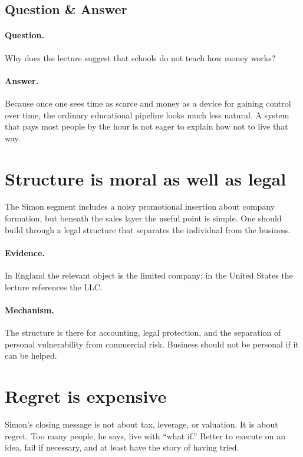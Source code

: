 \documentclass[11pt,oneside]{book}
\begin{document}
\subsection{Question \& Answer}

\paragraph{Question.} Why does the lecture suggest that schools do not teach how money works?

\paragraph{Answer.} Because once one sees time as scarce and money as a device for gaining control over time, the ordinary educational pipeline looks much less natural. A system that pays most people by the hour is not eager to explain how not to live that way.

\section{Structure is moral as well as legal}

The Simon segment includes a noisy promotional insertion about company formation, but beneath the sales layer the useful point is simple. One should build through a legal structure that separates the individual from the business.

\paragraph{Evidence.} In England the relevant object is the limited company; in the United States the lecture references the LLC.

\paragraph{Mechanism.} The structure is there for accounting, legal protection, and the separation of personal vulnerability from commercial risk. Business should not be personal if it can be helped.

\section{Regret is expensive}

Simon's closing message is not about tax, leverage, or valuation. It is about regret. Too many people, he says, live with ``what if.'' Better to execute on an idea, fail if necessary, and at least have the story of having tried.
\end{document}
